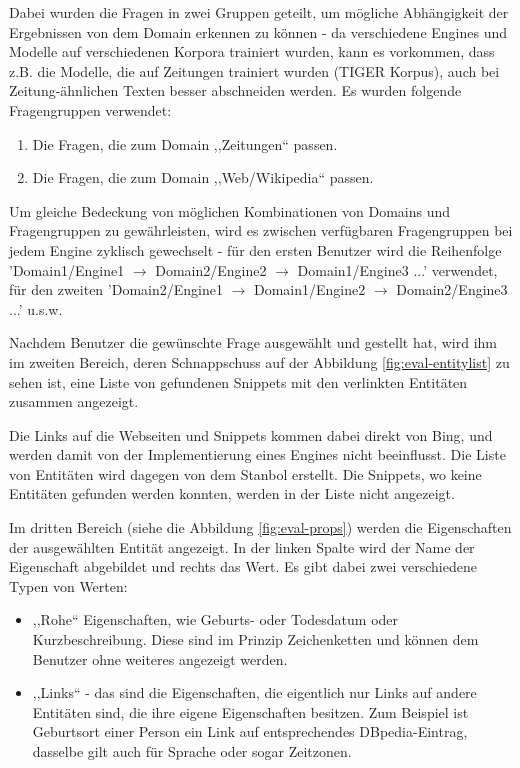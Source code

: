 Dabei wurden die Fragen in zwei Gruppen geteilt, um mögliche Abhängigkeit der Ergebnissen von dem Domain erkennen zu können - da verschiedene Engines und Modelle auf verschiedenen Korpora trainiert wurden, kann es vorkommen, dass z.B. die Modelle, die auf Zeitungen trainiert wurden (TIGER Korpus), auch bei Zeitung-ähnlichen Texten besser abschneiden werden. Es wurden folgende Fragengruppen verwendet:
\begin{enumerate}
\item Die Fragen, die zum Domain ,,Zeitungen`` passen. 
\item Die Fragen, die zum Domain ,,Web/Wikipedia`` passen.
\end{enumerate} 
Um gleiche Bedeckung von möglichen Kombinationen von Domains und Fragengruppen zu gewährleisten, wird es zwischen verfügbaren Fragengruppen bei jedem Engine zyklisch gewechselt - für den ersten Benutzer wird die Reihenfolge 'Domain1/Engine1 $\longrightarrow$ Domain2/Engine2 $\longrightarrow$ Domain1/Engine3 ...' verwendet, für den zweiten 'Domain2/Engine1 $\longrightarrow$ Domain1/Engine2 $\longrightarrow$ Domain2/Engine3 ...' u.s.w.

Nachdem Benutzer die gewünschte Frage ausgewählt und gestellt hat, wird ihm im zweiten Bereich, deren Schnappschuss auf der Abbildung \ref{fig:eval-entitylist} zu sehen ist, eine Liste von gefundenen Snippets mit den verlinkten Entitäten zusammen angezeigt.

Die Links auf die Webseiten und Snippets kommen dabei direkt von Bing, und werden damit von der Implementierung eines Engines nicht beeinflusst. Die Liste von Entitäten wird dagegen von dem Stanbol erstellt. Die Snippets, wo keine Entitäten gefunden werden konnten, werden in der Liste nicht angezeigt.

Im dritten Bereich (siehe die Abbildung \ref{fig:eval-props}) werden die Eigenschaften der ausgewählten Entität angezeigt. In der linken Spalte wird der Name der Eigenschaft abgebildet und rechts das Wert. Es gibt dabei zwei verschiedene Typen von Werten:
\begin{itemize}
\item ,,Rohe`` Eigenschaften, wie Geburts- oder Todesdatum oder Kurzbeschreibung. Diese sind im Prinzip Zeichenketten und können dem Benutzer ohne weiteres angezeigt werden.
\item ,,Links`` - das sind die Eigenschaften, die eigentlich nur Links auf andere Entitäten sind, die ihre eigene Eigenschaften besitzen. Zum Beispiel ist Geburtsort einer Person ein Link auf entsprechendes DBpedia-Eintrag, dasselbe gilt auch für Sprache oder sogar Zeitzonen.
\end{itemize}


